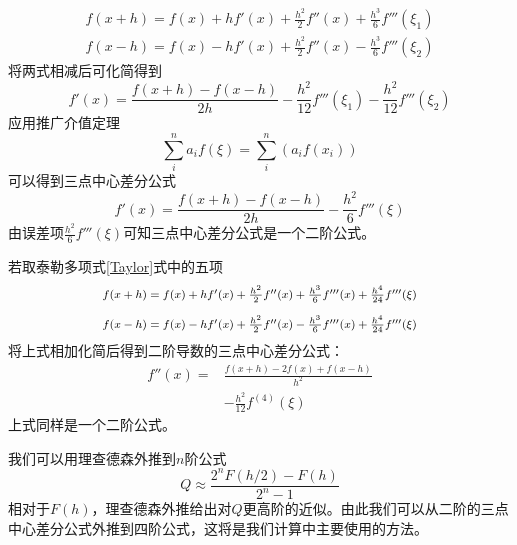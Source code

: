 \documentclass[UTF8,a4paper,10pt]{ctexart}
\begin{document}
\begin{multicols}{2}
            \begin{equation*}
                \begin{array}{l}
                    f(x+h) = f(x) + hf'(x) + \frac{h^2}{2}f''(x) + \frac{h^3}{6}f'''(\xi_1)\\
                    f(x-h) = f(x) - hf'(x) + \frac{h^2}{2}f''(x) - \frac{h^3}{6}f'''(\xi_2)
                \end{array}
            \end{equation*}
            将两式相减后可化简得到
            \begin{equation*}
                f'(x) = \frac{f(x+h)-f(x-h)}{2h} - \frac{h^2}{12}f'''(\xi_1) - \frac{h^2}{12}f'''(\xi_2)
            \end{equation*}
            应用推广介值定理
            \begin{equation}
                \sum_i^na_if(\xi) = \sum_i^n(a_if(x_i))
            \end{equation}
            可以得到三点中心差分公式
            \begin{equation*}
                f'(x) = \frac{f(x+h)-f(x-h)}{2h} - \frac{h^2}{6}f'''(\xi)
            \end{equation*}
            由误差项$\frac{h^2}{6}f'''(\xi)$可知三点中心差分公式是一个二阶公式。\par
            若取泰勒多项式\eqref{Taylor}式中的五项
            \begin{equation*}
                \begin{footnotesize}
                    \begin{array}{l}
                        f(x+h) = f(x) + hf'(x) + \frac{h^2}{2}f''(x) + \frac{h^3}{6}f'''(x) + \frac{h^4}{24}f'''(\xi)\\
                        \\
                        f(x-h) = f(x) - hf'(x) + \frac{h^2}{2}f''(x) - \frac{h^3}{6}f'''(x) + \frac{h^4}{24}f'''(\xi)
                    \end{array}
                \end{footnotesize}
            \end{equation*}
            将上式相加化简后得到二阶导数的三点中心差分公式：
            \begin{equation}
                \begin{split}
                    f''(x) = &\frac{f(x+h)-2f(x)+f(x-h)}{h^2}\\
                    &-\frac{h^2}{12}f^{(4)}(\xi)
                \end{split}
            \end{equation}
            上式同样是一个二阶公式。\par
            我们可以用理查德森外推到$n$阶公式
            \begin{equation}
                Q\approx\frac{2^nF(h/2)-F(h)}{2^n-1}
            \end{equation}
            相对于$F(h)$，理查德森外推给出对$Q$更高阶的近似。由此我们可以从二阶的三点中心差分公式外推到四阶公式，这将是我们计算中主要使用的方法。

\end{multicols}
\end{document}
